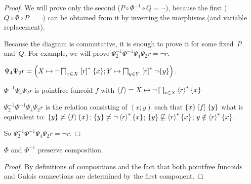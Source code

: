 \begin{proof}
We will prove only the second ($P\circ \Phi^{-1}\circ Q = \lnot$), because the first ($Q\circ\Phi\circ P= \lnot$)
can be obtained from it by inverting the morphisms (and variable replacement).

Because the diagram is commutative, it is enough to prove it for some fixed~$P$ and~$Q$.
For example, we will prove $\Psi_2^{-1} \Phi^{-1} \Psi_4 \Psi_2 r = \neg r$.

$\Psi_4 \Psi_2 r = \left( X \mapsto \neg \bigsqcap_{x \in X} \mathrel{\left[r\right]^{\ast}}
\{ x \} ; Y \mapsto \bigsqcap_{y \in Y} \mathrel{\left[r\right]^{\ast}} \neg \{ y \} \right)$.

$\Phi^{-1} \Psi_4 \Psi_2 r$ is pointfree funcoid $f$ with $\left\langle f\right\rangle
= X \mapsto \neg \bigsqcap_{x \in X} \left\langle r\right\rangle ^{\ast} \{ x \}$

$\Psi_2^{-1} \Phi^{-1} \Psi_4 \Psi_2 r$ is the relation consisting of $(x ;
y)$ such that $\{ x \} \mathrel{\left[f\right]} \{ y \}$ what is equivalent to: $\{ y \}
\not\asymp \left\langle f\right\rangle \{ x \}$; $\{ y \} \not\asymp \neg \left\langle r\right\rangle ^{\ast} \{ x \}$; $\{ y \} \not\sqsubseteq \left\langle r\right\rangle ^{\ast} \{ x \}$; $y \notin \left\langle r\right\rangle ^{\ast} \{ x \}$.

So $\Psi_2^{-1} \Phi^{-1} \Psi_4 \Psi_2 r = \neg r$.
\end{proof}

\begin{prop}
$\Phi$ and $\Phi^{-1}$ preserve composition.
\end{prop}

\begin{proof}
By definitions of compositions and the fact that both pointfree funcoids and Galois connections are determined by the first component.
\end{proof}